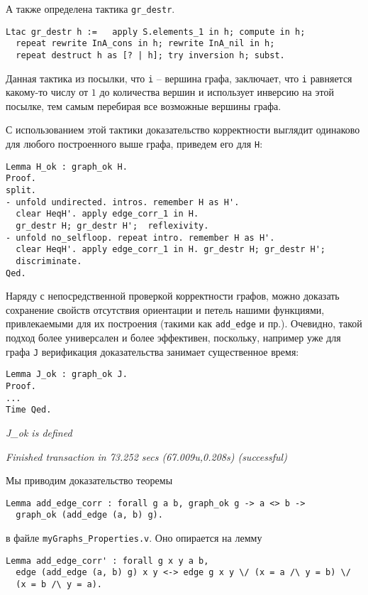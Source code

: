 А также определена тактика {\tt gr\_destr}.

\begin {verbatim}
Ltac gr_destr h :=   apply S.elements_1 in h; compute in h;
  repeat rewrite InA_cons in h; rewrite InA_nil in h;
  repeat destruct h as [? | h]; try inversion h; subst.
\end{verbatim}

Данная тактика из посылки, что {\tt i} -- вершина графа, заключает, что {\tt i} равняется какому-то числу от $1$ до количества вершин и использует инверсию на этой посылке, тем самым перебирая все возможные вершины графа.

С использованием этой тактики доказательство корректности выглядит одинаково для любого построенного выше графа, приведем его для {\tt H}:

\begin{verbatim}
Lemma H_ok : graph_ok H.
Proof.
split.
- unfold undirected. intros. remember H as H'.
  clear HeqH'. apply edge_corr_1 in H.
  gr_destr H; gr_destr H';  reflexivity.
- unfold no_selfloop. repeat intro. remember H as H'.
  clear HeqH'. apply edge_corr_1 in H. gr_destr H; gr_destr H';
  discriminate.
Qed.
\end{verbatim}

Наряду с непосредственной проверкой корректности графов, можно доказать сохранение свойств отсутствия ориентации и петель нашими функциями, привлекаемыми для их построения (такими как {\tt add\_edge} и пр.). Очевидно, такой подход более универсален и более эффективен, поскольку, например уже для графа {\tt J} верификация доказательства занимает существенное время:

\begin{verbatim}
Lemma J_ok : graph_ok J.
Proof.
...
Time Qed.
\end{verbatim}

{\it J\_ok is defined}

{\it Finished transaction in 73.252 secs (67.009u,0.208s) (successful) }

Мы приводим доказательство теоремы 

\begin{verbatim}
Lemma add_edge_corr : forall g a b, graph_ok g -> a <> b -> 
  graph_ok (add_edge (a, b) g).
\end{verbatim}
в файле {\tt myGraphs\_Properties.v}. Оно опирается на лемму 

\begin{verbatim}
Lemma add_edge_corr' : forall g x y a b,
  edge (add_edge (a, b) g) x y <-> edge g x y \/ (x = a /\ y = b) \/ 
  (x = b /\ y = a).
\end{verbatim}

